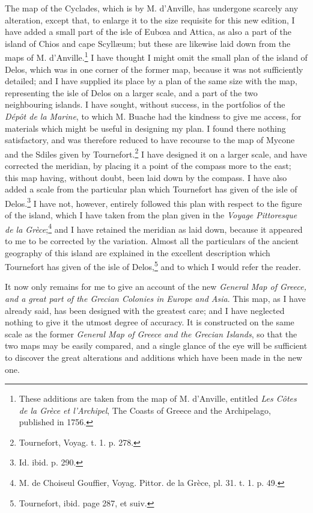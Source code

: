 \documentclass[a4paper, 11pt, oneside, polutonikogreek, english]{article}
\begin{document}
The map of the Cyclades, which is by M. d'Anville, has undergone scarcely any alteration, except that, to enlarge it to the size requisite for this new edition, I have added a small part of the isle of Eubœa and Attica, as also a part of the island of Chios and cape Scyllæum; but these are likewise laid down from the maps of M. d'Anville.\footnote{These additions are taken from the map of M. d'Anville, entitled \emph{Les Côtes de la Grèce et l'Archipel}, The Coasts of Greece and the Archipelago, published in 1756.} I have thought I might omit the small plan of the island of Delos, which was in one corner of the former map, because it was not sufficiently detailed; and I have supplied its place by a plan of the same size with the map, representing the isle of Delos on a larger scale, and a part of the two neighbouring islands. I have sought, without success, in the portfolios of the \emph{Dépôt de la Marine}, to which M. Buache had the kindness to give me access, for materials which might be useful in designing my plan. I found there nothing satisfactory, and was therefore reduced to have recourse to the map of Mycone and the Sdiles given by Tournefort.\footnote{Tournefort, Voyag. t. 1. p. 278.} I have designed it on a larger scale, and have corrected the meridian, by placing it a point of the compass more to the east; this map having, without doubt, been laid down by the compass. I have also added a scale from the particular plan which Tournefort has given of the isle of Delos.\footnote{Id. ibid. p. 290.} I have not, however, entirely followed this plan with respect to the figure of the island, which I have taken from the plan given in the \emph{Voyage Pittoresque de la Grèce};\footnote{M. de Choiseul Gouffier, Voyag. Pittor. de la Grèce, pl. 31. t. 1. p. 49.} and I have retained the meridian as laid down, because it appeared to me to be corrected by the variation. Almost all the particulars of the ancient geography of this island are explained in the excellent description which Tournefort has given of the isle of Delos,\footnote{Tournefort, ibid. page 287, et suiv.} and to which I would refer the reader.

It now only remains for me to give an account of the new \emph{General Map of Greece, and a great part of the Grecian Colonies in Europe and Asia}. This map, as I have already said, has been designed with the greatest care; and I have neglected nothing to give it the utmost degree of accuracy. It is constructed on the same scale as the former \emph{General Map of Greece and the Grecian Islands}, so that the two maps may be easily compared, and a single glance of the eye will be sufficient to discover the great alterations and additions which have been made in the new one.
\end{document}
